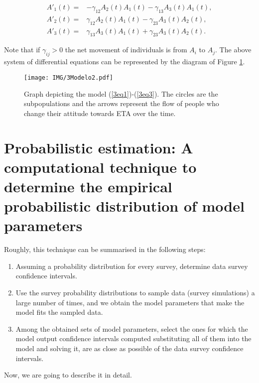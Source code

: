 \begin{eqnarray}
A'_1(t) = &  -\gamma_{12} A_2(t) A_1(t) - \gamma_{13} A_3(t) A_1(t), \label{3eq1} \\
A'_2(t) = &   \gamma_{12} A_2(t) A_1(t) - \gamma_{23} A_3(t) A_2(t), \\
A'_3(t) = &   \gamma_{13} A_3(t) A_1(t) + \gamma_{23} A_3(t) A_2(t). \label{3eq3}                           
\end{eqnarray} 

Note that if $\gamma_{ij} > 0$ the net movement of individuals is from $A_i$ to $A_j$. The above system of differential equations can be represented by the diagram of Figure \ref{3Modelo}. 
 
\begin{figure}[h]
 \begin{center}
  \texttt{[image: IMG/3Modelo2.pdf]}\\
  \caption{Graph depicting the model (\ref{3eq1})-(\ref{3eq3}). The circles are the subpopulations and the arrows represent the flow of people who change their attitude towards ETA over the time.}\label{3Modelo}
\end{center}
\end{figure} 

\section{Probabilistic estimation: A computational technique to determine the empirical probabilistic distribution of model parameters}\label{3.2}

Roughly, this technique can be summarised in the following steps:

\begin{enumerate}
\item Assuming a probability distribution for every survey, determine data survey confidence intervals.
\item Use the survey probability distributions to sample data (survey simulations) a large number of times, and we obtain the model parameters that make the model fits the sampled data.
\item Among the obtained sets of model parameters, select the ones for which the model output confidence intervals computed substituting all of them into the model and solving it, are as close as possible of the data survey confidence intervals.
\end{enumerate}

Now, we are going to describe it in detail.

